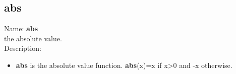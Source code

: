 \subsection{ abs }
\noindent Name: \textbf{abs}\\
the absolute value.\\

\noindent Description: \begin{itemize}

\item \textbf{abs} is the absolute value function. \textbf{abs}(x)=x if x>0 and -x otherwise.
\end{itemize}
